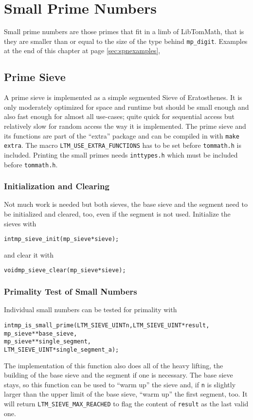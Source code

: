 \documentclass[synpaper]{book}
\begin{document}
\chapter{Small Prime Numbers}

Small prime numbers are those primes that fit in a limb of LibTomMath, that is they are smaller than or equal to the size of the type behind \texttt{mp\_digit}. Examples at the end of this chapter at page \ref{sec:spnexamples},
\section{Prime Sieve}
A prime sieve is implemented as a simple segmented Sieve of Eratosthenes. It is only moderately optimized for space and runtime but should be small enough and also fast enough for almost all use-cases; quite quick for sequential access but relatively slow for random access the way it is implemented. The prime sieve and its functions are part of the ``extra'' package and can be compiled in with \texttt{make extra}. The macro \texttt{LTM\_USE\_EXTRA\_FUNCTIONS} has to be set before \texttt{tommath.h} is included. Printing the small primes needs \texttt{inttypes.h} which must be included before \texttt{tommath.h}.
\subsection{Initialization and Clearing}
Not much work is needed but both sieves, the base sieve and the segment need to be initialized and cleared, too, even if the segment is not used.
Initialize the sieves with
\begin{alltt}
int mp_sieve_init(mp_sieve *sieve);
\end{alltt}
and clear it with
\begin{alltt}
void mp_sieve_clear(mp_sieve *sieve);
\end{alltt}
\subsection{Primality Test of Small Numbers}
Individual small numbers can be tested for primality with
\begin{alltt}
int mp_is_small_prime(LTM_SIEVE_UINT n, LTM_SIEVE_UINT *result,
                      mp_sieve **base_sieve,
                      mp_sieve **single_segment,
                      LTM_SIEVE_UINT *single_segment_a);
\end{alltt}
The implementation of this function also does all of the heavy lifting, the building of the base sieve and the segment if one is necessary. The base sieve stays, so this function can be used to ``warm up'' the sieve and, if \texttt{n} is slightly larger than the upper limit of the base sieve, ``warm up'' the first segment, too. It will return \texttt{LTM\_SIEVE\_MAX\_REACHED} to flag the content of \texttt{result} as the last valid one.
\end{document}
